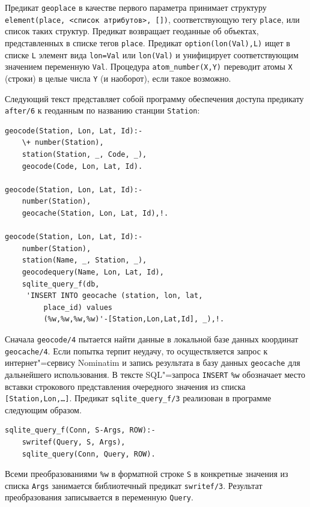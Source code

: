 \documentclass[a4paper,14pt, openany, twoside, final]{extbook} %
\begin{document}
Предикат \texttt{geoplace} в качестве первого параметра принимает структуру \texttt{element(place, <список атрибутов>, [])}, соответствующую тегу \texttt{place}, или список таких структур.  Предикат возвращает геоданные об объектах, представленных в списке тегов \texttt{place}.  Предикат \texttt{option(lon(Val),L)} ищет в списке \texttt{L} элемент вида \texttt{lon=Val} или \texttt{lon(Val)} и унифицирует соответствующим значением переменную \texttt{Val}.  Процедура \texttt{atom\_number(X,Y)} переводит атомы \texttt{X} (строки) в целые числа \texttt{Y} (и наоборот), если такое возможно.

Следующий текст представляет собой программу обеспечения доступа предикату \texttt{after/6} к геоданным по названию станции \texttt{Station}:

\begin{verbatim}
geocode(Station, Lon, Lat, Id):-
    \+ number(Station),
    station(Station, _, Code, _),
    geocode(Code, Lon, Lat, Id).

geocode(Station, Lon, Lat, Id):-
    number(Station),
    geocache(Station, Lon, Lat, Id),!.

geocode(Station, Lon, Lat, Id):-
    number(Station),
    station(Name, _, Station, _),
    geocodequery(Name, Lon, Lat, Id),
    sqlite_query_f(db,
     'INSERT INTO geocache (station, lon, lat,
         place_id) values
         (%w,%w,%w,%w)'-[Station,Lon,Lat,Id], _),!.
\end{verbatim}


Сначала \texttt{geocode/4} пытается найти данные в локальной базе данных координат \texttt{geocache/4}.  Если попытка терпит неудачу, то осуществляется запрос к интернет"=сервису \foreignlanguage{latin}{Nominatim} и запись результата в базу данных \texttt{geocache} для дальнейшего использования.  В тексте SQL"=запроса \texttt{INSERT} \texttt{\%w} обозначает место вставки строкового представления очередного значения из списка \texttt{[Station,Lon,\ldots]}.  Предикат \texttt{sqlite\_query\_f/3} реализован в программе следующим образом.

\begin{verbatim}
sqlite_query_f(Conn, S-Args, ROW):-
    swritef(Query, S, Args),
    sqlite_query(Conn, Query, ROW).
\end{verbatim}

Всеми преобразованиями \texttt{\%w} в форматной строке \texttt{S} в конкретные значения из списка \texttt{Args} занимается библиотечный предикат \texttt{swritef/3}.  Результат преобразования записывается в переменную \texttt{Query}.
\end{document}
